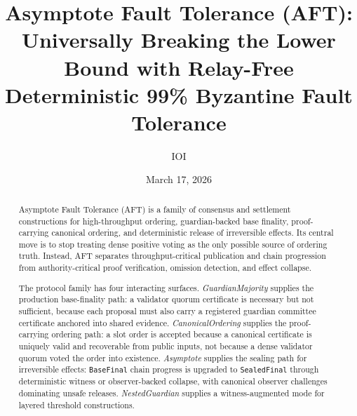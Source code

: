 \documentclass[11pt]{article}
\title{Asymptote Fault Tolerance (AFT): Universally Breaking the Lower Bound with Relay-Free Deterministic 99\% Byzantine Fault Tolerance}
\author{IOI}
\date{March 17, 2026}
\newcommand{\AFT}{\textsc{AFT}}
\newcommand{\code}[1]{\texttt{#1}}
\newcommand{\term}[1]{\textit{#1}}
\begin{document}
\maketitle

\begin{abstract}
Asymptote Fault Tolerance (\AFT{}) is a family of consensus and settlement constructions for
high-throughput ordering, guardian-backed base finality, proof-carrying
canonical ordering, and deterministic release of irreversible effects. Its
central move is to stop treating dense positive voting as the only possible
source of ordering truth. Instead, \AFT{} separates throughput-critical
publication and chain progression from authority-critical proof verification,
omission detection, and effect collapse.

The protocol family has four interacting surfaces. \term{GuardianMajority}
supplies the production base-finality path: a validator quorum certificate is
necessary but not sufficient, because each proposal must also carry a
registered guardian committee certificate anchored into shared evidence.
\term{CanonicalOrdering} supplies the proof-carrying ordering path: a slot
order is accepted because a canonical certificate is uniquely valid and
recoverable from public inputs, not because a dense validator quorum voted the
order into existence. \term{Asymptote} supplies the sealing path for
irreversible effects: \code{BaseFinal} chain progress is upgraded to
\code{SealedFinal} through deterministic witness or observer-backed collapse,
with canonical observer challenges dominating unsafe releases.
\term{NestedGuardian} supplies a
witness-augmented mode for layered threshold constructions.


\end{abstract}
\end{document}
